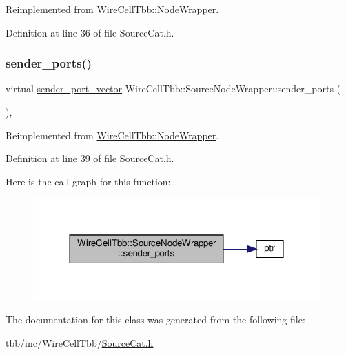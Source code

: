 Reimplemented from \hyperlink{class_wire_cell_tbb_1_1_node_wrapper_a28e71be3d95b85701c947def9d11af64}{Wire\+Cell\+Tbb\+::\+Node\+Wrapper}.



Definition at line 36 of file Source\+Cat.\+h.

\mbox{\label{class_wire_cell_tbb_1_1_source_node_wrapper_acd2f3593b008c9570593412192b99b33}} 
\subsubsection{\texorpdfstring{sender\+\_\+ports()}{sender\_ports()}}
{\footnotesize\ttfamily virtual \hyperlink{namespace_wire_cell_tbb_a99272fef0f0c33dc9d4e6e8f777b2e6e}{sender\+\_\+port\+\_\+vector} Wire\+Cell\+Tbb\+::\+Source\+Node\+Wrapper\+::sender\+\_\+ports (\begin{DoxyParamCaption}{ }\end{DoxyParamCaption})\hspace{0.3cm}{\ttfamily [inline]}, {\ttfamily [virtual]}}



Reimplemented from \hyperlink{class_wire_cell_tbb_1_1_node_wrapper_a4ed2daeddbb2f75934759ac8f9a3ce8b}{Wire\+Cell\+Tbb\+::\+Node\+Wrapper}.



Definition at line 39 of file Source\+Cat.\+h.

Here is the call graph for this function\+:
\nopagebreak
\begin{figure}[H]
\begin{center}
\leavevmode
\includegraphics[width=312pt]{class_wire_cell_tbb_1_1_source_node_wrapper_acd2f3593b008c9570593412192b99b33_cgraph}
\end{center}
\end{figure}


The documentation for this class was generated from the following file\+:\begin{DoxyCompactItemize}
\item 
tbb/inc/\+Wire\+Cell\+Tbb/\hyperlink{_source_cat_8h}{Source\+Cat.\+h}\end{DoxyCompactItemize}
